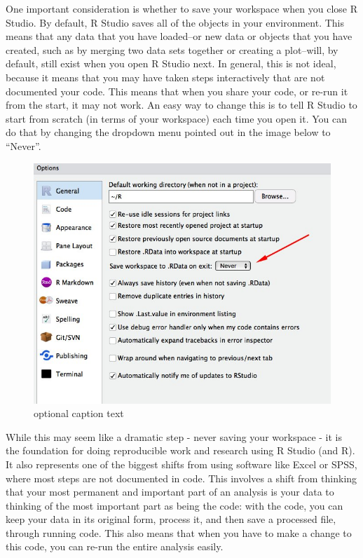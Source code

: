 \documentclass[]{book}
\begin{document}
One important consideration is whether to save your workspace when you
close R Studio. By default, R Studio saves all of the objects in your
environment. This means that any data that you have loaded--or new data
or objects that you have created, such as by merging two data sets
together or creating a plot--will, by default, still exist when you open
R Studio next. In general, this is not ideal, because it means that you
may have taken steps interactively that are not documented your code.
This means that when you share your code, or re-run it from the start,
it may not work. An easy way to change this is to tell R Studio to start
from scratch (in terms of your workspace) each time you open it. You can
do that by changing the dropdown menu pointed out in the image below to
``Never''.

\begin{figure}
\centering
\includegraphics{images/save-workspace-reminder.jpg}
\caption{optional caption text}
\end{figure}

While this may seem like a dramatic step - never saving your workspace -
it is the foundation for doing reproducible work and research using R
Studio (and R). It also represents one of the biggest shifts from using
software like Excel or SPSS, where most steps are not documented in
code. This involves a shift from thinking that your most permanent and
important part of an analysis is your data to thinking of the most
important part as being the code: with the code, you can keep your data
in its original form, process it, and then save a processed file,
through running code. This also means that when you have to make a
change to this code, you can re-run the entire analysis easily.
\end{document}
